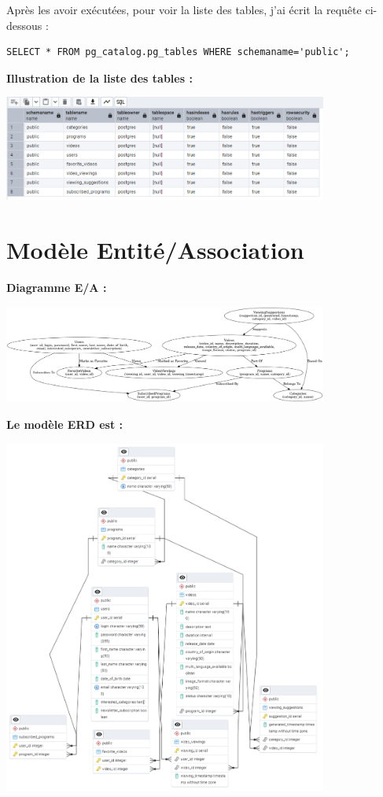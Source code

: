 \documentclass[a4paper, 12pt]{article}
\begin{document}
Après les avoir exécutées, pour voir la liste des tables, j'ai écrit la requête ci-dessous :

\begin{lstlisting}
SELECT * FROM pg_catalog.pg_tables WHERE schemaname='public';
\end{lstlisting}

\textbf{Illustration de la liste des tables :}

\begin{center}
\includegraphics[width=0.8\textwidth]{photo1.jpg}
\end{center}

\section*{Modèle Entité/Association}

\textbf{Diagramme E/A :}

\begin{center}
\includegraphics[width=0.8\textwidth]{photo2.jpg}
\end{center}

\textbf{Le modèle ERD est :}

\begin{center}
\includegraphics[width=0.8\textwidth]{photo3.jpg}
\end{center}
\end{document}

